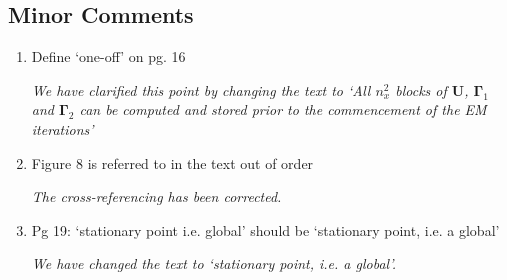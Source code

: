 \documentclass{article}
\begin{document}
			\subsection{Minor Comments}
			\begin{enumerate}
			 \item 	Define `one-off' on pg. 16 

 			\emph{We have clarified this point by changing the text to `All $n_x^2$ blocks of $\mathbf U$, $\boldsymbol\Gamma_1$ and $\boldsymbol\Gamma_2$ can be computed and stored prior to the commencement of the EM iterations' }

  		\item Figure 8 is referred to in the text out of order

  			\emph{The cross-referencing has been corrected.}
			 
			\item Pg 19: `stationary point i.e. global' should be `stationary point, i.e. a global'

			\emph{We have changed the text to `stationary point, i.e. a global'.}		
			                   
			
			 
				\end{enumerate} 
				
			
\end{document}
